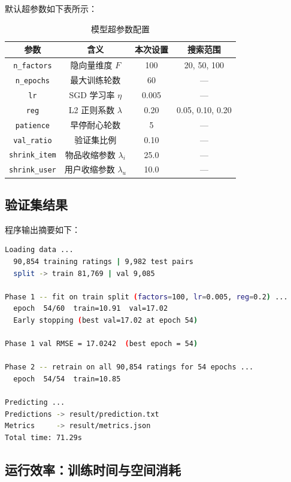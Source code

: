 \documentclass[UTF8,a4paper,10pt]{ctexart}
\begin{document}
默认超参数如下表所示：

\begin{table}[H]
  \centering
  \caption{模型超参数配置}
  \begin{tabular}{c c c c}
    \toprule
    \textbf{参数} & \textbf{含义} & \textbf{本次设置} & \textbf{搜索范围} \\
    \midrule
    \texttt{n\_factors} & 隐向量维度 $F$ & 100 & 20, 50, 100 \\
    \texttt{n\_epochs}  & 最大训练轮数   & 60  & — \\
    \texttt{lr}         & SGD 学习率 $\eta$ & 0.005 & — \\
    \texttt{reg}        & L2 正则系数 $\lambda$ & 0.20 & 0.05, 0.10, 0.20 \\
    \texttt{patience}   & 早停耐心轮数   & 5   & — \\
    \texttt{val\_ratio} & 验证集比例     & 0.10 & — \\
    \texttt{shrink\_item} & 物品收缩参数 $\lambda_i$ & 25.0 & — \\
    \texttt{shrink\_user} & 用户收缩参数 $\lambda_u$ & 10.0 & — \\
    \bottomrule
  \end{tabular}
\end{table}

\subsection{验证集结果}

程序输出摘要如下：

\begin{lstlisting}[language=bash, caption={程序运行输出摘要}]
Loading data ...
  90,854 training ratings | 9,982 test pairs
  split -> train 81,769 | val 9,085

Phase 1 -- fit on train split (factors=100, lr=0.005, reg=0.2) ...
  epoch  54/60  train=10.91  val=17.02
  Early stopping (best val=17.02 at epoch 54)

Phase 1 val RMSE = 17.0242  (best epoch = 54)

Phase 2 -- retrain on all 90,854 ratings for 54 epochs ...
  epoch  54/54  train=10.85

Predicting ...
Predictions -> result/prediction.txt
Metrics     -> result/metrics.json
Total time: 71.29s
\end{lstlisting}

\subsection{运行效率：训练时间与空间消耗}
\end{document}
